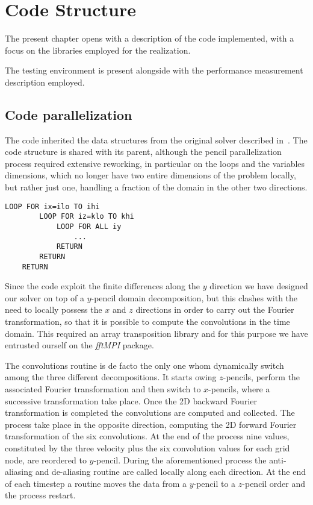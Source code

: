 \chapter{Code Structure}
The present chapter opens with a description of the code implemented, with a focus on the libraries employed for the realization.\par
The testing environment is present alongside with the performance measurement description employed.


\section{Code parallelization}
The code inherited the data structures from the original solver described in~\cite{cpl:presentazione}. The code structure is shared with its parent, although the pencil parallelization process required extensive reworking, in particular on the loops and the variables dimensions, which no longer have two entire dimensions of the problem locally, but rather just one, handling a fraction of the domain in the other two directions. 

\begin{lstlisting}[caption={The new FOR loop design. ilo and klo indicates the smallest local mode, while ihi and khi indicates the biggest local mode on the processor},captionpos=b]
	LOOP FOR ix=ilo TO ihi
  		LOOP FOR iz=klo TO khi
			LOOP FOR ALL iy
				...
			RETURN
		RETURN
	RETURN
\end{lstlisting}

Since the code exploit the finite differences along the $y$ direction we have designed our solver on top of a $y$-pencil domain decomposition, but this clashes with the need to locally possess the $x$ and $z$ directions in order to carry out the Fourier transformation, so that it is possible to compute the convolutions in the time domain. This required an array transposition library and for this purpose we have entrusted ourself on the \emph{fftMPI} package.\par
The convolutions routine is de facto the only one whom dynamically switch among the three different decompositions. It starts owing $z$-pencils, perform the associated Fourier transformation and then switch to $x$-pencils, where a successive transformation take place. Once the 2D backward Fourier transformation is completed the convolutions are computed and collected. The process take place in the opposite direction, computing the 2D forward Fourier transformation of the six convolutions. At the end of the process nine values, constituted by the three velocity plus the six convolution values for each grid node, are reordered to $y$-pencil. During the aforementioned process the anti-aliasing and de-aliasing routine are called locally along each direction. At the end of each timestep a routine moves the data from a $y$-pencil to a $z$-pencil order and the process restart.\par

